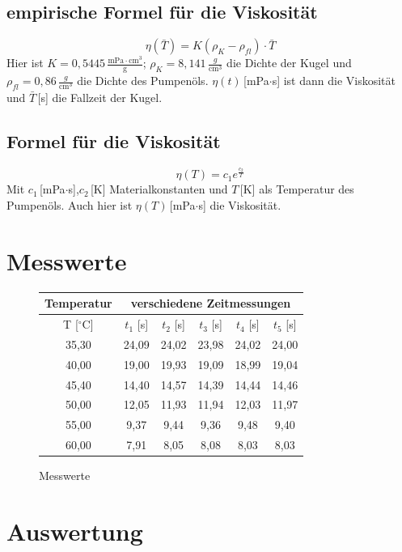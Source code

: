\documentclass[fontsize=12pt]{scrartcl}
\begin{document}
\subsection{empirische Formel für die Viskosität }
\begin{equation}
\eta(\bar{T})=K(\rho_K-\rho_{fl})\cdot\bar{T}
\label{emp}
\end{equation}
Hier ist $K=0,5445\,\frac{\text{mPa}\cdot\text{cm}^3}{\text{g}}$; $\rho_K =8,141\,\frac{g}{\text{cm}^3}$ die Dichte der Kugel und $\rho_{fl} =0,86\,\frac{g}{\text{cm}^3}$ die Dichte des Pumpenöls. $\eta(t)$\,[mPa$\cdot$s] ist dann die Viskosität und $\bar{T}$\,[s] die Fallzeit der Kugel.

\subsection{Formel für die Viskosität }
\begin{equation}
\eta(T)=c_1 e^{\frac{c_2}{T}}
\label{vis}
\end{equation}
Mit $c_1$\,[mPa$\cdot$s],$c_2$\,[K] Materialkonstanten und $T$\,[K] als Temperatur des Pumpenöls. Auch hier ist $\eta(T)$\,[mPa$\cdot$s] die Viskosität.
\newpage

\section{ Messwerte}
\begin{figure}[H]
\centering
\caption{Messwerte}
\begin{tabular}{|c|c|c|c|c|c|} \hline
Temperatur & \multicolumn{5}{c|}{verschiedene Zeitmessungen} \\ \hline
T [$^{\circ}$C]	& $t_1$ [s] & $t_2$ [s]	& $t_3$ [s]	 & $t_4$ [s]	& $t_5$ [s] \\ \hline
35,30	&24,09	&24,02	&23,98	&24,02	&24,00 \\ \hline
40,00	&19,00	&19,93	&19,09	&18,99	&19,04 \\ \hline
45,40	&14,40	&14,57	&14,39	&14,44	&14,46 \\ \hline
50,00	&12,05	&11,93		&11,94		&12,03	&11,97 \\ \hline
55,00	&9,37		&9,44		&9,36		&9,48		&9,40 \\ \hline
60,00	&7,91		&8,05		&8,08		&8,03		&8,03 \\ \hline
\end{tabular}				
\end{figure}
\newpage

\section{ Auswertung}
\end{document}
